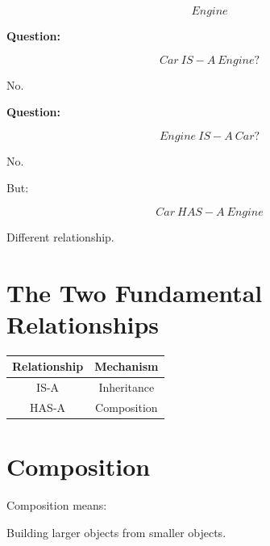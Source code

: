 \documentclass[11pt,a4paper]{book}
\begin{document}
\[
Engine
\]


\textbf{Question:}

\[
Car\ IS\!-\!A\ Engine?
\]

No.


\textbf{Question:}

\[
Engine\ IS\!-\!A\ Car?
\]

No.


But:

\[
Car\ HAS\!-\!A\ Engine
\]


Different relationship.


\section{The Two Fundamental Relationships}

\begin{center}

\begin{tabular}{|c|c|}
\hline
Relationship & Mechanism \\
\hline
IS-A & Inheritance \\
\hline
HAS-A & Composition \\
\hline
\end{tabular}

\end{center}


\section{Composition}

\begin{idea}

Composition means:

Building larger objects from smaller objects.

\end{idea}

\end{document}
